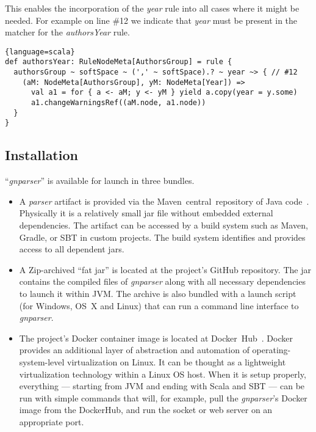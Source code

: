 \documentclass{bmcart}
\begin{document}
This enables the incorporation of the \textit{year} rule into all cases where it might be needed. For example on line \#12 we indicate that \textit{year} must be present in the matcher for the \textit{authorsYear} rule.

\begin{lstlisting}{language=scala}
def authorsYear: RuleNodeMeta[AuthorsGroup] = rule {
  authorsGroup ~ softSpace ~ (',' ~ softSpace).? ~ year ~> { // #12
    (aM: NodeMeta[AuthorsGroup], yM: NodeMeta[Year]) =>
      val a1 = for { a <- aM; y <- yM } yield a.copy(year = y.some)
      a1.changeWarningsRef((aM.node, a1.node))
  }
}
\end{lstlisting}

\subsection*{Installation}

``\textit{gnparser}'' is available for launch in three bundles.

\begin{itemize} \item A \textit{parser} artifact is provided via the Maven~central~repository of Java code~\cite{maven-globalnames}. Physically it is a relatively small jar file without embedded external dependencies. The artifact can be accessed by a build system such as Maven, Gradle, or SBT in custom projects. The build system identifies and provides access to all dependent jars.

  \item A Zip-archived ``fat jar'' is located at the project's GitHub repository. The jar contains the compiled files of \textit{gnparser} along with all necessary dependencies to launch it within JVM\@. The archive is also bundled with a launch script (for Windows, OS~X and Linux) that can run a command line interface to \textit{gnparser}.

  \item The project's Docker container image is located at Docker~Hub~\cite{gnparser-docker}. Docker provides an additional layer of abstraction and automation of operating-system-level virtualization on Linux. It can be thought as a lightweight virtualization technology within a Linux OS host.  When it is setup properly, everything --- starting from JVM and ending with Scala and SBT --- can be run with simple commands that will, for example, pull the \textit{gnparser}'s Docker image from the DockerHub, and run the socket or web server on an appropriate port.

\end{itemize}
\end{document}
